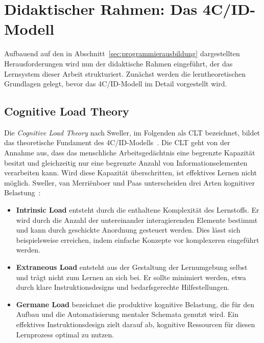
\section{Didaktischer Rahmen: Das 4C/ID-Modell}\label{sec:4cid}

Aufbauend auf den in Abschnitt~\ref{sec:programmierausbildung} dargestellten Herausforderungen wird nun der didaktische Rahmen eingeführt, der das Lernsystem dieser Arbeit strukturiert. Zunächst werden die lerntheoretischen Grundlagen gelegt, bevor das 4C/ID-Modell im Detail vorgestellt wird.

\subsection{Cognitive Load Theory}\label{subsec:clt}\label{subsec:lerntheorie}

Die \textit{Cognitive Load Theory} nach Sweller, im Folgenden als CLT bezeichnet, bildet das theoretische Fundament des 4C/ID-Modells~\cite{sweller1988}. Die CLT geht von der Annahme aus, dass das menschliche Arbeitsgedächtnis eine begrenzte Kapazität besitzt und gleichzeitig nur eine begrenzte Anzahl von Informationselementen verarbeiten kann. Wird diese Kapazität überschritten, ist effektives Lernen nicht möglich. Sweller, van Merriënboer und Paas unterscheiden drei Arten kognitiver Belastung~\cite{sweller1998}:

\begin{itemize}
    \item \textbf{Intrinsic Load} entsteht durch die enthaltene Komplexität des Lernstoffs. Er wird durch die Anzahl der untereinander interagierenden Elemente bestimmt und kann durch geschickte Anordnung gesteuert werden. Dies lässt sich beispielsweise erreichen, indem einfache Konzepte vor komplexeren eingeführt werden.
    \item \textbf{Extraneous Load} entsteht aus der Gestaltung der Lernumgebung selbst und trägt nicht zum Lernen an sich bei. Er sollte minimiert werden, etwa durch klare Instruktionsdesigns und bedarfsgerechte Hilfestellungen.
    \item \textbf{Germane Load} bezeichnet die produktive kognitive Belastung, die für den Aufbau und die Automatisierung mentaler Schemata genutzt wird. Ein effektives Instruktionsdesign zielt darauf ab, kognitive Ressourcen für diesen Lernprozess optimal zu nutzen.
\end{itemize}

